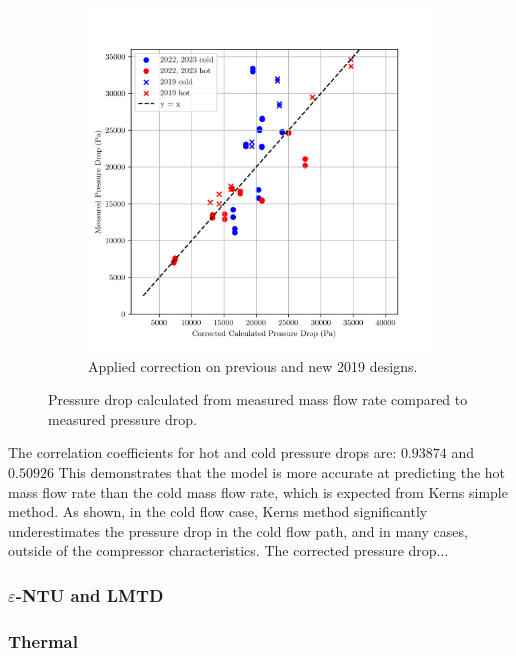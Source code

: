 \documentclass{article}
\begin{document}
\begin{figure}[H]
\begin{subfigure}{.49\textwidth}
    \includegraphics[width=.99\linewidth]{dp_ccalc_vs_meas.png}
    \caption{Applied correction on previous and new 2019 designs.}
    \label{fig:corrected_pressure_drops}
  \end{subfigure}
    
  \caption{Pressure drop calculated from measured mass flow rate compared to measured pressure drop.}
  \label{fig:pressure_drops}

\end{figure}

The correlation coefficients for hot and cold pressure drops are:  $\mathbf{0.93874}$ and $\mathbf{0.50926}$
This demonstrates that the model is more accurate at predicting the hot mass flow rate than the cold mass flow rate,
which is expected from Kerns simple method.
As shown, in the cold flow case, Kerns method significantly underestimates the pressure drop in the cold flow path, and in many cases, outside of the compressor characteristics.
The corrected pressure drop...

\subsubsection{$\varepsilon$-NTU and LMTD}

\subsubsection{Thermal}
\end{document}
